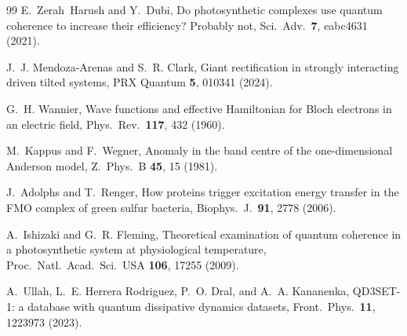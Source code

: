 \documentclass[aps,pre,preprint,floatfix]{revtex4-2}
\begin{document}
\begin{thebibliography}{99}
E.~Zerah~Harush and Y.~Dubi,
Do photosynthetic complexes use quantum coherence to increase their
efficiency? Probably not,
Sci.\ Adv.\ \textbf{7}, eabc4631 (2021).

J.~J. Mendoza-Arenas and S.~R. Clark,
Giant rectification in strongly interacting driven tilted systems,
PRX Quantum \textbf{5}, 010341 (2024).

G.~H. Wannier,
Wave functions and effective Hamiltonian for Bloch electrons in an electric
field,
Phys.\ Rev.\ \textbf{117}, 432 (1960).

M.~Kappus and F.~Wegner,
Anomaly in the band centre of the one-dimensional Anderson model,
Z.~Phys.~B \textbf{45}, 15 (1981).

J.~Adolphs and T.~Renger,
How proteins trigger excitation energy transfer in the FMO complex of green
sulfur bacteria,
Biophys.\ J.\ \textbf{91}, 2778 (2006).

A.~Ishizaki and G.~R. Fleming,
Theoretical examination of quantum coherence in a photosynthetic system at
physiological temperature,
Proc.\ Natl.\ Acad.\ Sci.\ USA \textbf{106}, 17255 (2009).

A.~Ullah, L.~E. Herrera Rodriguez, P.~O. Dral, and A.~A. Kananenka,
QD3SET-1: a database with quantum dissipative dynamics datasets,
Front.\ Phys.\ \textbf{11}, 1223973 (2023).

\end{thebibliography}
\end{document}
